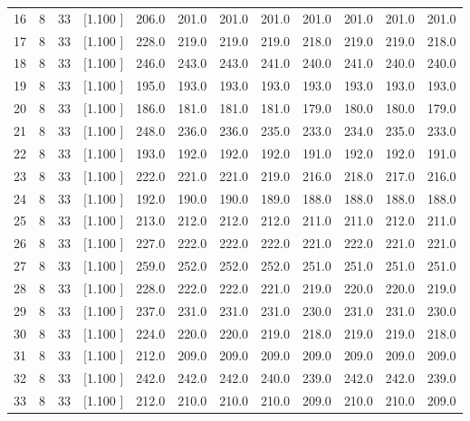 \documentclass[12pt,a4paper]{article}
\begin{document}
\begin{center}
{\begin{tabular}{r r r r r r r r r r r r}
  16&  8& 33&[1.100     ]&   206.0&   201.0&   201.0&   201.0&   201.0&   201.0&   201.0&   201.0\\[-0.02in]
  17&  8& 33&[1.100     ]&   228.0&   219.0&   219.0&   219.0&   218.0&   219.0&   219.0&   218.0\\[-0.02in]
  18&  8& 33&[1.100     ]&   246.0&   243.0&   243.0&   241.0&   240.0&   241.0&   240.0&   240.0\\[-0.02in]
  19&  8& 33&[1.100     ]&   195.0&   193.0&   193.0&   193.0&   193.0&   193.0&   193.0&   193.0\\[-0.02in]
  20&  8& 33&[1.100     ]&   186.0&   181.0&   181.0&   181.0&   179.0&   180.0&   180.0&   179.0\\[-0.02in]
  21&  8& 33&[1.100     ]&   248.0&   236.0&   236.0&   235.0&   233.0&   234.0&   235.0&   233.0\\[-0.02in]
  22&  8& 33&[1.100     ]&   193.0&   192.0&   192.0&   192.0&   191.0&   192.0&   192.0&   191.0\\[-0.02in]
  23&  8& 33&[1.100     ]&   222.0&   221.0&   221.0&   219.0&   216.0&   218.0&   217.0&   216.0\\[-0.02in]
  24&  8& 33&[1.100     ]&   192.0&   190.0&   190.0&   189.0&   188.0&   188.0&   188.0&   188.0\\[-0.02in]
  25&  8& 33&[1.100     ]&   213.0&   212.0&   212.0&   212.0&   211.0&   211.0&   212.0&   211.0\\[-0.02in]
  26&  8& 33&[1.100     ]&   227.0&   222.0&   222.0&   222.0&   221.0&   222.0&   221.0&   221.0\\[-0.02in]
  27&  8& 33&[1.100     ]&   259.0&   252.0&   252.0&   252.0&   251.0&   251.0&   251.0&   251.0\\[-0.02in]
  28&  8& 33&[1.100     ]&   228.0&   222.0&   222.0&   221.0&   219.0&   220.0&   220.0&   219.0\\[-0.02in]
  29&  8& 33&[1.100     ]&   237.0&   231.0&   231.0&   231.0&   230.0&   231.0&   231.0&   230.0\\[-0.02in]
  30&  8& 33&[1.100     ]&   224.0&   220.0&   220.0&   219.0&   218.0&   219.0&   219.0&   218.0\\[-0.02in]
  31&  8& 33&[1.100     ]&   212.0&   209.0&   209.0&   209.0&   209.0&   209.0&   209.0&   209.0\\[-0.02in]
  32&  8& 33&[1.100     ]&   242.0&   242.0&   242.0&   240.0&   239.0&   242.0&   242.0&   239.0\\[-0.02in]
  33&  8& 33&[1.100     ]&   212.0&   210.0&   210.0&   210.0&   209.0&   210.0&   210.0&   209.0\\[-0.02in]

\end{tabular}}
\end{center}
\end{document}

